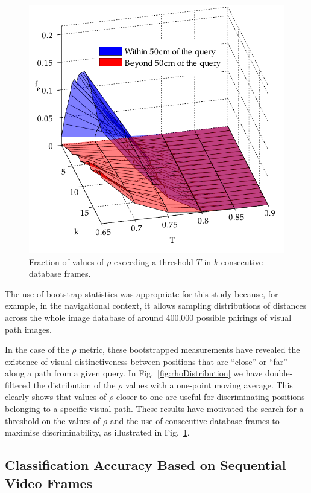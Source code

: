 \begin{figure}
\begin{center}
\includegraphics[width=.8\linewidth]{./gfx/Chapter02/C1twoTestWithBootstrapping2.pdf}
\caption{Fraction of values of $\rho$ exceeding a threshold $T$ in $k$ consecutive database frames.}
\label{fig:rocTwoParametersC5}
\end{center}
\end{figure}

The use of bootstrap statistics was appropriate for this study because, for example, in the navigational context, it allows sampling distributions of distances across the whole image database of around 400,000 possible pairings of visual path images.

In the case of the $\rho$ metric, these bootstrapped measurements have revealed the existence of visual distinctiveness between positions that are ``close'' or ``far'' along a path from a given query. In Fig.~\ref{fig:rhoDistribution} we have double-filtered the distribution of the $\rho$ values with a one-point moving average. This clearly shows that values of $\rho$ closer to one are useful for discriminating positions belonging to a specific visual path. These results have motivated the search for a threshold on the values of $\rho$ and the use of consecutive database frames to maximise discriminability, as illustrated in Fig.~\ref{fig:rocTwoParametersC5}.

\subsection{Classification Accuracy Based on Sequential Video Frames} \label{sec:expResults2}

